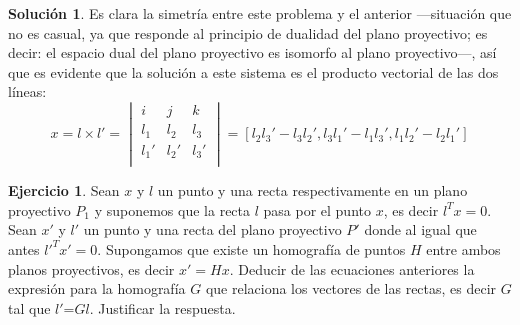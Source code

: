 \documentclass[a4paper, 11pt]{article}
\theoremstyle{definition}
\newtheorem{ejercicio}{Ejercicio}
\newtheorem*{solucion}{Solución}
\theoremstyle{theorem}
\begin{document}
\begin{solucion}
      Es clara la simetría entre este problema y el anterior ---situación que no es casual, ya que responde al principio de dualidad del plano proyectivo; es decir: el espacio dual del plano proyectivo es isomorfo al plano proyectivo---, así que es evidente que la solución a este sistema es el producto vectorial de las dos líneas:
      \[
      x = l \times l' =
      \begin{vmatrix}
          i & j & k \\
          l_1 & l_2 & l_3 \\
          l_1' & l_2' & l_3' \\
      \end{vmatrix} =
      [l_2l_3'-l_3l_2', l_3l_1'-l_1l_3', l_1l_2'-l_2l_1']
      \]
  \end{solucion}

  \begin{ejercicio}
      Sean $x$ y $l$ un punto y una recta respectivamente en un plano proyectivo $P_1$ y suponemos que la recta $l$ pasa por el punto $x$, es decir $l^Tx=0$. Sean $x'$ y $l'$ un punto y una recta del plano proyectivo $P'$ donde al igual que antes $l'^Tx'=0$. Supongamos que existe un homografía de puntos $H$ entre ambos planos proyectivos, es decir $x'=Hx$. Deducir de las ecuaciones anteriores la expresión para la homografía $G$ que relaciona los vectores de las rectas, es decir $G$ tal que $l'$=$Gl$. Justificar la respuesta.
  \end{ejercicio}
\end{document}
